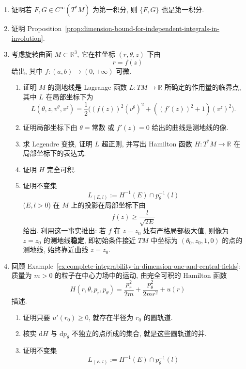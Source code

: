 \begin{RiemannExercise}\label{ex:completely-integrable-systems}
\begin{enumerate}[label=(\arabic*),ref=\arabic*,leftmargin=*]
\item\label{ex:poisson-bracket-of-first-integrals}
证明若 $F,G\in C^\infty(T^*M)$ 为第一积分, 则 $\{F,G\}$ 也是第一积分.
\item\label{ex:prove-involutive-integral-dimension-bound}
证明 Proposition~\ref{prop:dimension-bound-for-independent-integrals-in-involution}.
\item\label{ex:complete-integrability-of-surface-of-revolution}
考虑旋转曲面 $M\subset\mathbb{R}^3$, 它在柱坐标 $(r,\theta,z)$ 下由
\[
  r=f(z)
\]
给出, 其中 $f:(a,b)\to(0,+\infty)$ 可微.
\begin{enumerate}[label=(\alph*),leftmargin=*]
\item 证明 $M$ 的测地线是 Lagrange 函数 $L:TM\to\mathbb{R}$ 所确定的作用量的临界点, 其中 $L$ 在局部坐标下为
\[
  L(\theta,z,v^\theta,v^z)
    =\frac{1}{2}\bigl((f(z))^2(v^\theta)^2+((f'(z))^2+1)(v^z)^2\bigr).
\]
\item 证明局部坐标下由 $\theta=\text{常数}$ 或 $f'(z)=0$ 给出的曲线是测地线的像.
\item 求 Legendre 变换, 证明 $L$ 超正则, 并写出 Hamilton 函数 $H:T^*M\to\mathbb{R}$ 在局部坐标下的表达式.
\item 证明 $H$ 完全可积.
\item 证明不变集
\[
  L_{(E,l)}:=H^{-1}(E)\cap p_\theta^{-1}(l)
\]
($E,l>0$) 在 $M$ 上的投影在局部坐标下由
\[
  f(z)\geq\frac{l}{\sqrt{2E}}
\]
给出. 利用这一事实推出: 若 $f$ 在 $z=z_0$ 处有严格局部极大值, 则像为 $z=z_0$ 的测地线\textbf{稳定}, 即初始条件接近 $TM$ 中坐标为 $(\theta_0,z_0,1,0)$ 的点的测地线, 始终靠近曲线 $z=z_0$.
\end{enumerate}
\item\label{ex:stability-of-central-field-circular-orbits}
回顾 Example~\ref{ex:complete-integrability-in-dimension-one-and-central-fields}: 质量为 $m>0$ 的粒子在中心力场中的运动, 由完全可积的 Hamilton 函数
\[
  H(r,\theta,p_r,p_\theta)=\frac{p_r^2}{2m}+\frac{p_\theta^2}{2mr^2}+u(r)
\]
描述.
\begin{enumerate}[label=(\alph*),leftmargin=*]
\item 证明只要 $u'(r_0)\geq0$, 就存在半径为 $r_0$ 的圆轨道.
\item 核实 $\mathrm{d}H$ 与 $\mathrm{d}p_\theta$ 不独立的点所成的集合, 就是这些圆轨道的并.
\item 证明不变集
\[
  L_{(E,l)}:=H^{-1}(E)\cap p_\theta^{-1}(l)
\]
\end{enumerate}
\end{enumerate}
\end{RiemannExercise}
